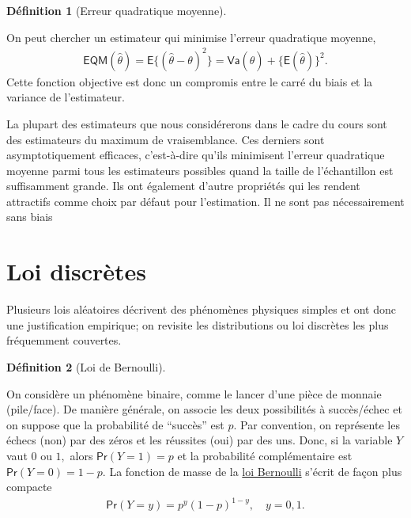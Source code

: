 \documentclass[
  11pt,
  letterpaper,
]{scrbook}
\theoremstyle{plain}
\theoremstyle{plain}
\theoremstyle{definition}
\theoremstyle{definition}
\newtheorem{definition}{Définition}[chapter]
\theoremstyle{remark}
\begin{document}
\begin{definition}[Erreur quadratique
moyenne]\protect\hypertarget{def-eqm}{}\label{def-eqm}

On peut chercher un estimateur qui minimise l'erreur quadratique
moyenne, \begin{align*}
\mathsf{EQM}(\hat{\theta}) = \mathsf{E}\{(\hat{\theta}-\theta)^2\}=\mathsf{Va}(\hat{\theta}) + \{\mathsf{E}(\hat{\theta})\}^2.
\end{align*} Cette fonction objective est donc un compromis entre le
carré du biais et la variance de l'estimateur.

\end{definition}

La plupart des estimateurs que nous considérerons dans le cadre du cours
sont des estimateurs du maximum de vraisemblance. Ces derniers sont
asymptotiquement efficaces, c'est-à-dire qu'ils minimisent l'erreur
quadratique moyenne parmi tous les estimateurs possibles quand la taille
de l'échantillon est suffisamment grande. Ils ont également d'autre
propriétés qui les rendent attractifs comme choix par défaut pour
l'estimation. Il ne sont pas nécessairement sans biais

\section{Loi discrètes}\label{loi-discruxe8tes}

Plusieurs lois aléatoires décrivent des phénomènes physiques simples et
ont donc une justification empirique; on revisite les distributions ou
loi discrètes les plus fréquemment couvertes.

\begin{definition}[Loi de
Bernoulli]\protect\hypertarget{def-loibern}{}\label{def-loibern}

On considère un phénomène binaire, comme le lancer d'une pièce de
monnaie (pile/face). De manière générale, on associe les deux
possibilités à succès/échec et on suppose que la probabilité de
``succès'' est \(p.\) Par convention, on représente les échecs (non) par
des zéros et les réussites (oui) par des uns. Donc, si la variable \(Y\)
vaut \(0\) ou \(1,\) alors \(\mathsf{Pr}(Y=1)=p\) et la probabilité
complémentaire est \(\mathsf{Pr}(Y=0)=1-p.\) La fonction de masse de la
\href{https://fr.wikipedia.org/wiki/Loi_de_Bernoulli}{loi Bernoulli}
s'écrit de façon plus compacte \begin{align*}
\mathsf{Pr}(Y=y) = p^y (1-p)^{1-y}, \quad y=0, 1.
\end{align*}

\end{definition}
\end{document}
